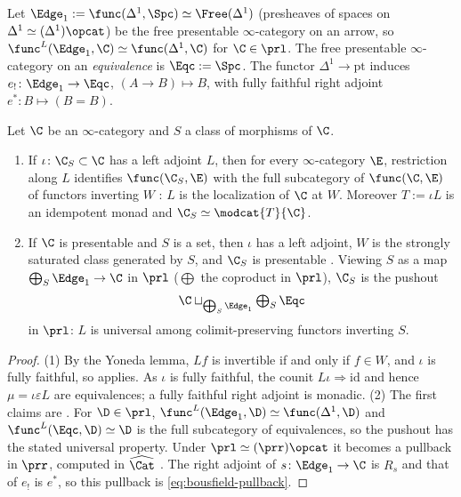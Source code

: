 %
Let
$\Edge_{1} := \func(\Delta^{1},\Spc) \simeq \Free(\Delta^{1})$
(presheaves of spaces on
$\Delta^{1} \simeq (\Delta^{1})\opcat$)
be the free presentable $\infty$-category on an arrow, so
$\func^{L}(\Edge_{1},\C) \simeq \func(\Delta^{1},\C)$
for $\C \in \prl$. The free presentable $\infty$-category on an
\emph{equivalence} is $\Eqc := \Spc$.
The functor
$\Delta^{1} \to \mathrm{pt}$
induces
$e_{!}\colon \Edge_{1} \to \Eqc$,
$(A \to B) \mapsto B$, with fully faithful right adjoint
$e^{*}\colon B \mapsto (B = B)$.

\begin{prop}
\label{prop:bousfield-pushout}
%
Let $\C$ be an $\infty$-category and $S$ a class of morphisms of $\C$.
\begin{enumerate}
\item If
$\iota\colon \C_{S} \subset \C$
has a left adjoint $L$, then for every $\infty$-category $\E$,
restriction along $L$ identifies $\func(\C_{S},\E)$ with the full subcategory of
$\func(\C,\E)$ of functors inverting $W$ \cite[5.2.7.12]{htt}:
$L$ is the localization of $\C$ at $W$. Moreover $T := \iota L$ is an idempotent
monad and
$\C_{S} \simeq \modcat{T}{\C}$.
\item If $\C$ is presentable and $S$ is a set, then $\iota$ has a left adjoint,
$W$ is the strongly saturated class generated by $S$,
and $\C_{S}$ is presentable \cite[5.5.4.15]{htt}. Viewing $S$ as a map
$\bigoplus_{S}\Edge_{1} \to \C$
in $\prl$ ($\bigoplus$ the coproduct in $\prl$), $\C_{S}$ is the pushout
\begin{equation*}
\C \sqcup_{\bigoplus_{S}\Edge_{1}} \textstyle\bigoplus_{S}\Eqc
\end{equation*}
in $\prl$: $L$ is universal among colimit-preserving functors inverting $S$.
\end{enumerate}
\end{prop}

\begin{proof}
%
(1) By the Yoneda lemma, $Lf$ is invertible if and only if $f \in W$,
and $\iota$ is fully faithful, so \cite[5.2.7.12]{htt} applies.
As $\iota$ is fully faithful, the counit
$L\iota \Rightarrow \mathrm{id}$
and hence
$\mu = \iota\varepsilon L$
are equivalences; a fully faithful right adjoint is monadic.
(2) The first claims are \cite[5.5.4.15]{htt}. For $\D \in \prl$,
$\func^{L}(\Edge_{1},\D) \simeq \func(\Delta^{1},\D)$
and
$\func^{L}(\Eqc,\D) \simeq \D$
is the full subcategory of equivalences,
so the pushout has the stated universal property. Under
$\prl \simeq (\prr)\opcat$
\cite[5.5.3.4]{htt} it becomes a pullback in $\prr$,
computed in $\widehat{\Cat}$ \cite[5.5.3.18]{htt}. The right adjoint of
$s\colon \Edge_{1} \to \C$
is $R_{s}$ and that of $e_{!}$ is $e^{*}$,
so this pullback is \eqref{eq:bousfield-pullback}.
\end{proof}

